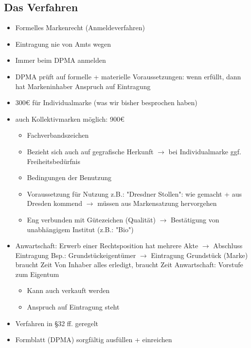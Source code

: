 \documentclass{report}
\begin{document}
\subsection{Das Verfahren}
\begin{itemize}
	\item Formelles Markenrecht (Anmeldeverfahren)
	\item Eintragung nie von Amts wegen
	\item Immer beim DPMA anmelden
	\item DPMA prüft auf formelle + materielle Voraussetzungen:
	\newline wenn erfüllt, dann hat Markeninhaber Anspruch auf Eintragung
	\item 300€ für Individualmarke (was wir bisher besprochen haben)
	\item auch Kollektivmarken möglich: 900€
	\begin{itemize}
		\item Fachverbandszeichen
		\item Bezieht sich auch auf gegrafische Herkunft $\rightarrow$ bei Individualmarke ggf. Freiheitsbedürfnis
		\item Bedingungen der Benutzung
		\item Voraussetzung für Nutzung
		\newline z.B.: "Dresdner Stollen": wie gemacht + aus Dresden kommend
		\newline $\rightarrow$ müssen aus Markensatzung hervorgehen
		\item Eng verbunden mit Gütezeichen (Qualität)
		\newline $\rightarrow$ Bestätigung von unabhängigem Institut (z.B.: "Bio")
	\end{itemize}
	\item Anwartschaft: Erwerb einer Rechtsposition hat mehrere Akte $\rightarrow$ Abschluss Eintragung
	\newline Bsp.: Grundstückeigentümer $\rightarrow$ Eintragung Grundstück (Marke) braucht Zeit
	\newline Von Inhaber alles erledigt, braucht Zeit
	\newline Anwartschaft: Vorstufe zum Eigentum
	\begin{itemize}
		\item Kann auch verkauft werden
		\item Anspruch auf Eintragung steht
	\end{itemize}
	\item Verfahren in §32 ff. geregelt
	\item Formblatt (DPMA) sorgfältig ausfüllen + einreichen

\end{itemize}
\end{document}
